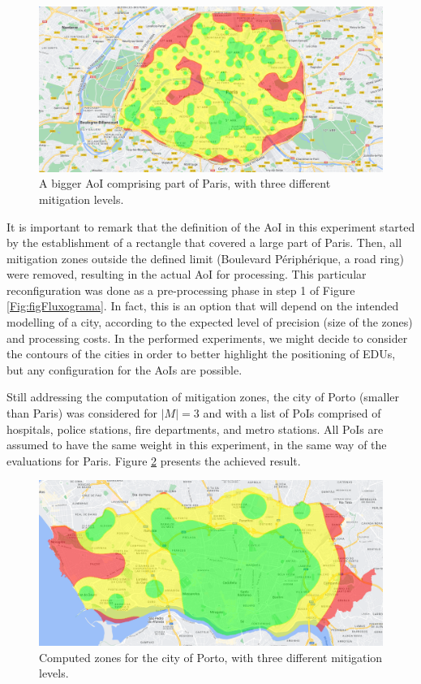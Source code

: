 \begin{refsection}
\begin{figure}[ht!]
  \centering
  \includegraphics[width=0.9\linewidth]{Chapters/2-EDUs/images/paris_M3.png}
  \caption{A bigger AoI comprising part of Paris, with three different mitigation levels.}\label{Fig:zones_paris_3}
\end{figure}

It is important to remark that the definition of the AoI in this experiment started by the establishment of a rectangle that covered a large part of Paris. Then, all mitigation zones outside the defined limit (Boulevard Périphérique, a road ring) were removed, resulting in the actual AoI for processing. This particular reconfiguration was done as a pre-processing phase in step 1 of Figure \ref{Fig:figFluxograma}. In fact, this is an option that will depend on the intended modelling of a city, according to the expected level of precision (size of the zones) and processing costs. In the performed experiments, we might decide to consider the contours of the cities in order to better highlight the positioning of EDUs, but any configuration for the AoIs are possible.

Still addressing the computation of mitigation zones, the city of Porto (smaller than Paris) was considered for $|M|=3$ and with a list of PoIs comprised of hospitals, police stations, fire departments, and metro stations. All PoIs are assumed to have the same weight in this experiment, in the same way of the evaluations for Paris. Figure \ref{Fig:zones_porto_3} presents the achieved result. 

\begin{figure}[ht!]
  \centering
  \includegraphics[width=0.9\linewidth]{Chapters/2-EDUs/images/porto_M3_no_weight.png}
  \caption{Computed zones for the city of Porto, with three different mitigation levels.}\label{Fig:zones_porto_3}
\end{figure}


\end{refsection}
